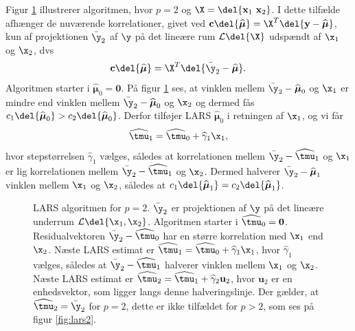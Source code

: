 Figur \ref{fig:lars} illustrerer algoritmen, hvor $p = 2$ og $\X = \del{\textbf{x}_1 \  \textbf{x}_2}$.
I dette tilfælde afhænger de nuværende korrelationer, givet ved \(\textbf{c}\del{\boldsymbol{\widehat{\mu}}} = \X^T\del{\textbf{y} - \widehat{\boldsymbol{\mu}}}\), kun af projektionen \(\bar{\y}_2\) af \(\y\) på det lineære rum $\mathcal{L} \del{\X}$ udspændt af \(\x_1\) og \(\x_2\), dvs 
\begin{align*}
\textbf{c}\del{\boldsymbol{\widehat{\mu}}} =  \X^T \del{ \bar{\y}_2 - \boldsymbol{\widehat{\mu}}}.
\end{align*}
Algoritmen starter i $\widehat{\boldsymbol{\mu}}_0 = \textbf{0}$.
På figur \ref{fig:lars} ses, at vinklen mellem \(\bar{\y}_2 - \widehat{\boldsymbol{\mu}}_0\) og \(\x_1\) er mindre end vinklen mellem \(\bar{\y}_2 - \widehat{\boldsymbol{\mu}}_0\) og \(\x_2\) og dermed fås \(c_1 \del{\widehat{\boldsymbol{\mu}}_0} > c_2 \del{\widehat{\boldsymbol{\mu}}_0}\).
Derfor tilføjer LARS \(\widehat{\boldsymbol{\mu}}_0\) i retningen af \(\x_1\), og vi får
\begin{align*}
\widehat{\tmu}_1 = \widehat{\tmu}_0 + \widehat{\gamma}_1 \x_1,
\end{align*}
hvor stepstørrelsen \(\widehat{\gamma}_1\) vælges, således at korrelationen mellem \(\bar{\y}_2 - \widehat{\tmu}_1\) og \(\x_1\) er lig korrelationen mellem \(\bar{\y}_2 - \widehat{\tmu}_1\) og \(\x_2\).
Dermed halverer \(\bar{\y}_2 - \widehat{\boldsymbol{\mu}}_1\) vinklen mellem \(\x_1\) og \(\x_2\), således at \(c_1 \del{\widehat{\boldsymbol{\mu}}_1} = c_2 \del{\widehat{\boldsymbol{\mu}}_1}\).
%
\begin{figure}[H]
\centering
\scalebox{0.8}{}
\caption{LARS algoritmen for \(p=2\). \(\bar{\y}_2\) er projektionen af \(\y\) på det lineære underrum \(\mathcal{L} \del{\x_1, \x_2}\).
Algoritmen starter i \(\widehat{\tmu}_0=\mathbf{0}\). Residualvektoren \(\bar{\y}_2 - \widehat{\tmu}_0\) har en større korrelation med \(\x_1\) end \(\x_2\). Næste LARS estimat er \(\widehat{\tmu}_1 = \widehat{\tmu}_0 + \widehat{\gamma}_1 \x_1\), hvor \(\widehat{\gamma}_1\) vælges, således at \(\bar{\y}_2 - \widehat{\tmu}_1\) halverer vinklen mellem \(\x_1\) og \(\x_2\). Næste LARS estimat er \(\widehat{\tmu}_2 = \widehat{\tmu}_1 + \widehat{\gamma}_2 \mathbf{u}_2\), hvor \(\mathbf{u}_2\) er en enhedsvektor, som ligger langs denne halveringslinje.
Der gælder, at \(\widehat{\tmu}_2 = \bar{\y}_2\) for \(p=2\), dette er ikke tilfældet for \(p>2\), som ses på figur \ref{fig:lars2}.
 }\label{fig:lars}
\end{figure}
